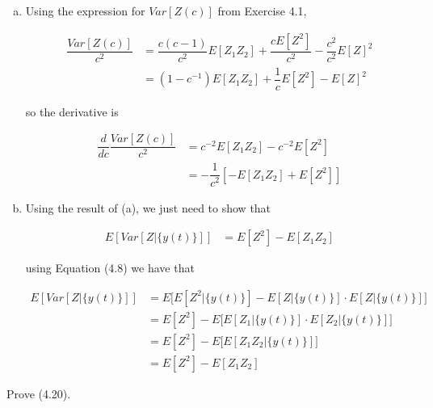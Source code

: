 \documentclass[12pt]{article}
\numberwithin{questioncounter}{section}
\begin{document}
\begin{solution}
\begin{enumerate}[(a)]
\item Using the expression for $Var[Z(c)]$ from Exercise 4.1,

\begin{align*}
\dfrac{Var[Z(c)]}{c^2} &= \dfrac{c(c-1)}{c^2} E[Z_{1}Z_{2}] + \dfrac{cE[Z^2]}{c^2} - \dfrac{c^2}{c^2} E[Z]^2 \\
&= (1 - c^{-1}) E[Z_{1}Z_{2}] + \dfrac{1}{c} E[Z^2] - E[Z]^2
\end{align*}

so the derivative is

\begin{align*}
\dfrac{d}{dc} \dfrac{Var[Z(c)]}{c^2} &= c^{-2} E[Z_{1}Z_{2}] - c^{-2} E[Z^2] \\
&= -\dfrac{1}{c^2} [-E[Z_{1}Z_{2}] + E[Z^2]]
\end{align*}

\item Using the result of (a), we just need to show that

\begin{align*}
E[Var[Z | \{y(t)\}]] &= E[Z^2] - E[Z_{1}Z_{2}]
\end{align*}

using Equation (4.8) we have that

\begin{align*}
E[Var[Z|\{y(t)\}]] &= E\Big[ E[Z^2|\{y(t)\}] - E[Z|\{y(t)\}] \cdot E[Z|\{y(t)\}] \Big] \\
&= E[Z^2] - E\Big[ E[Z_{1}|\{y(t)\}] \cdot E[Z_{2}|\{y(t)\}] \Big] \\
&= E[Z^2] - E\Big[ E[Z_{1}Z_{2}|\{y(t)\}] \Big] \\
&= E[Z^{2}] - E[Z_{1}Z_{2}]
\end{align*}

\end{enumerate}
\end{solution}

\begin{question}
Prove (4.20).
\end{question}
\end{document}

